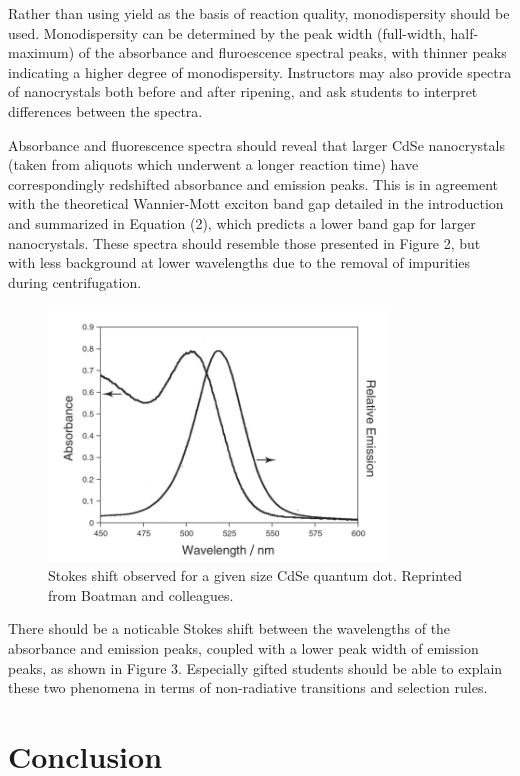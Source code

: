 \documentclass[journal = jceda8, manuscript = article]{achemso}
\begin{document}
Rather than using yield as the basis of reaction quality, monodispersity should
be used. Monodispersity can be determined by the peak width (full-width,
half-maximum) of the absorbance and fluroescence spectral peaks, with thinner
peaks indicating a higher degree of monodispersity. Instructors may also provide
spectra of nanocrystals both before and after ripening, and ask students to
interpret differences between the spectra.

Absorbance and fluorescence spectra should reveal that larger CdSe nanocrystals
(taken from aliquots which underwent a longer reaction time) have
correspondingly redshifted absorbance and emission peaks. This is in agreement
with the theoretical Wannier-Mott exciton band gap detailed in the introduction
and summarized in Equation (2), which predicts a lower band gap for larger
nanocrystals. These spectra should resemble those presented in Figure 2, but
with less background at lower wavelengths due to the removal of impurities
during centrifugation.

\begin{figure}[H]
	\includegraphics[width=0.8\textwidth]{./figures/stokes.png}
	\caption{Stokes shift observed for a given size CdSe quantum dot.
	Reprinted from Boatman and colleagues. \cite{jce-2}}
\end{figure}

There should be a noticable Stokes shift between the wavelengths of the
absorbance and emission peaks, coupled with a lower peak width of emission
peaks, as shown in Figure 3. Especially gifted students should be able to
explain these two phenomena in terms of non-radiative transitions and selection
rules.

\section{Conclusion}


\newpage


\end{document}
